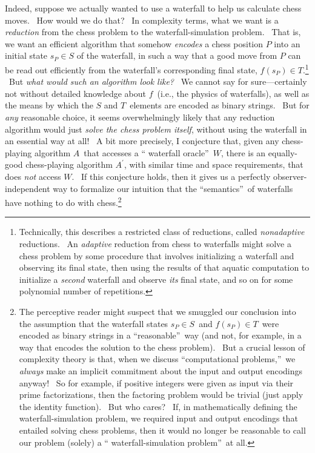 \documentclass[12pt,onecolumn]{article}%
\begin{document}
Indeed, suppose we actually wanted to use a waterfall to help us calculate
chess moves. \ How would we do that? \ In complexity terms, what we want is a
\textit{reduction} from the chess problem to the waterfall-simulation problem.
\ That is, we want an efficient algorithm that somehow \textit{encodes} a
chess position $P$ into an initial state $s_{P}\in S$ of the waterfall, in
such a way that a good move from $P$ can be read out efficiently from the
waterfall's corresponding final state, $f\left(  s_{P}\right)  \in
T$.\footnote{Technically, this describes a restricted class of reductions,
called \textit{nonadaptive} reductions. \ An \textit{adaptive} reduction from
chess to waterfalls might solve a chess problem by some procedure that
involves initializing a waterfall and observing its final state, then using
the results of that aquatic computation to initialize a \textit{second}
waterfall and observe \textit{its} final state, and so on for some polynomial
number of repetitions.} \ But \textit{what would such an algorithm look like?}
\ We cannot say for sure---certainly not without detailed knowledge about
$f$\ (i.e., the physics of waterfalls), as well as the means by which the $S$
and $T$\ elements are encoded as binary strings. \ But for \textit{any}
reasonable choice, it seems overwhelmingly likely that any reduction algorithm
would just \textit{solve the chess problem itself}, without using the
waterfall in an essential way at all! \ A bit more precisely, I conjecture
that, given any chess-playing algorithm $A$\ that accesses a \textquotedblleft
waterfall oracle\textquotedblright\ $W$, there is an equally-good
chess-playing algorithm $A^{\prime}$, with similar time and space
requirements, that does \textit{not} access $W$. \ If this conjecture holds,
then it gives us a perfectly observer-independent way to formalize our
intuition that the \textquotedblleft semantics\textquotedblright\ of
waterfalls have nothing to do with chess.\footnote{The perceptive reader might
suspect that we smuggled our conclusion into the assumption that the waterfall
states $s_{P}\in S$\ and $f\left(  s_{P}\right)  \in T$\ were encoded as
binary strings in a \textquotedblleft reasonable\textquotedblright\ way (and
not, for example, in a way that encodes the solution to the chess problem).
\ But a crucial lesson of complexity theory is that, when we discuss
\textquotedblleft computational problems,\textquotedblright\ we
\textit{always} make an implicit commitment about the input and output
encodings anyway! \ So for example, if positive integers were given as input
via their prime factorizations, then the factoring problem would be trivial
(just apply the identity function). \ But who cares? \ If, in mathematically
defining the waterfall-simulation problem, we required input and output
encodings that entailed solving chess problems, then it would no longer be
reasonable to call our problem (solely) a \textquotedblleft
waterfall-simulation problem\textquotedblright\ at all.}
\end{document}
